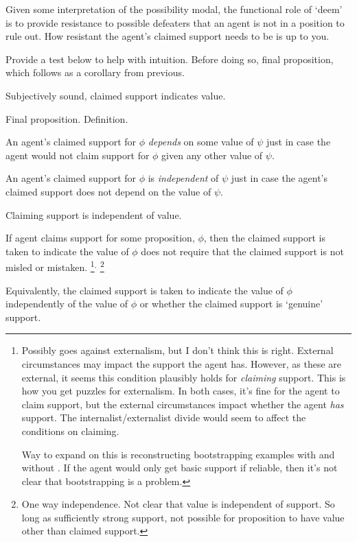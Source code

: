 \begin{note}
  Given some interpretation of the possibility modal, the functional role of `deem' is to provide resistance to possible defeaters that an agent is not in a position to rule out.
  How resistant the agent's claimed support needs to be is up to you.

  Provide a test below to help with intuition.
  Before doing so, final proposition, which follows as a corollary from previous.
\end{note}

\begin{note}[\eiS{}]
  Subjectively sound, claimed support indicates value.

  Final proposition.
  Definition.

  \begin{definition}
    An agent's claimed support for \(\phi\) \emph{depends} on some value of \(\psi\) just in case the agent would not claim support for \(\phi\) given any other value of \(\psi\).

    An agent's claimed support for \(\phi\) is \emph{independent} of \(\psi\) just in case the agent's claimed support does not depend on the value of \(\psi\).
  \end{definition}

  Claiming support is independent of value.

  \begin{proposition}[\eiS{-} --- \eiS{}]\label{prop:supp:independence}
    If agent claims support for some proposition, \(\phi\), then the claimed support is taken to indicate the value of \(\phi\) does not require that the claimed support is not misled or mistaken.\nolinebreak
    \footnote{
      Possibly goes against externalism, but I don't think this is right.
      External circumstances may impact the support the agent has.
      However, as these are external, it seems this condition plausibly holds for \emph{claiming} support.
      This is how you get puzzles for externalism.
      In both cases, it's fine for the agent to claim support, but the external circumstances impact whether the agent \emph{has} support.
      The internalist/externalist divide would seem to affect the conditions on claiming.

      Way to expand on this is reconstructing bootstrapping examples with and without \eiS{}.
      If the agent would only get basic support if reliable, then it's not clear that bootstrapping is a problem.
    }\(^{,}\)\nolinebreak
    \footnote{
      One way independence.
      Not clear that value is independent of support.
      So long as sufficiently strong support, not possible for proposition to have value other than claimed support.
    }
  \end{proposition}
  Equivalently, the claimed support is taken to indicate the value of \(\phi\) independently of the value of \(\phi\) or whether the claimed support is `genuine' support.


\end{note}
